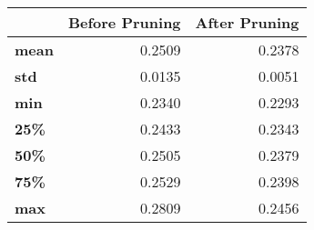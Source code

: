 \begin{tabular}{lrr}
\toprule
{} &  Before Pruning &  After Pruning \\
\midrule
\textbf{mean} &          0.2509 &         0.2378 \\
\textbf{std } &          0.0135 &         0.0051 \\
\textbf{min } &          0.2340 &         0.2293 \\
\textbf{25\% } &          0.2433 &         0.2343 \\
\textbf{50\% } &          0.2505 &         0.2379 \\
\textbf{75\% } &          0.2529 &         0.2398 \\
\textbf{max } &          0.2809 &         0.2456 \\
\bottomrule
\end{tabular}
